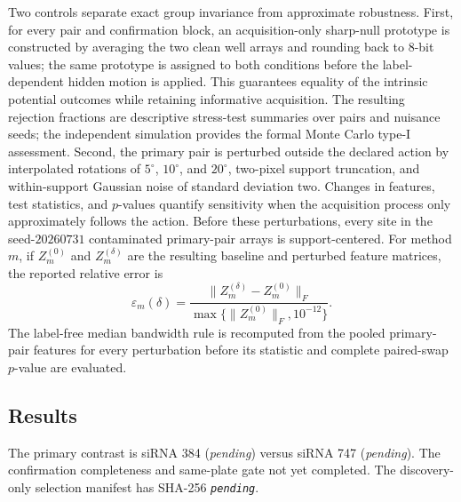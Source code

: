 \documentclass[11pt]{article}
\theoremstyle{definition}
\theoremstyle{remark}
\newcommand{\1}{\mathbf 1}
\newcommand{\pending}{\textnormal{\textit{pending}}}
\newif\ifresultsavailable
\providecommand{\RxTreatmentA}{\pending}
\providecommand{\RxTreatmentB}{\pending}
\providecommand{\RxPlateAudit}{not yet completed}
\providecommand{\RxManifestHash}{\pending}
\begin{document}
Two controls separate exact group invariance from approximate robustness.
First, for every pair and confirmation block, an acquisition-only sharp-null
prototype is constructed by averaging the two clean well arrays and rounding
back to 8-bit values; the same prototype is assigned to both conditions before
the label-dependent hidden motion is applied.  This guarantees equality of the
intrinsic potential outcomes while retaining informative acquisition.  The
resulting rejection fractions are descriptive stress-test summaries over
pairs and nuisance seeds; the independent simulation provides the formal Monte
Carlo type-I assessment.  Second, the primary pair is perturbed outside the
declared action by interpolated rotations of \(5^\circ\), \(10^\circ\), and
\(20^\circ\), two-pixel support truncation, and within-support Gaussian noise of
standard deviation two.  Changes in features, test statistics, and
\(p\)-values quantify sensitivity when the acquisition process only
approximately follows the action.  Before these perturbations, every site in
the seed-\(20260731\) contaminated primary-pair arrays is support-centered.
For method \(m\), if \(Z_m^{(0)}\) and \(Z_m^{(\delta)}\) are the resulting
baseline and perturbed feature matrices, the reported relative error is
\[
 \varepsilon_m(\delta)=
 \frac{\|Z_m^{(\delta)}-Z_m^{(0)}\|_F}
 {\max\{\|Z_m^{(0)}\|_F,10^{-12}\}}.
\]
The label-free median bandwidth rule is recomputed from the pooled primary-pair
features for every perturbation before its statistic and complete paired-swap
\(p\)-value are evaluated.

\subsection{Results}

\ifresultsavailable
The primary contrast is siRNA 384 (\RxTreatmentA) versus siRNA 747
(\RxTreatmentB).  The confirmation completeness and same-plate gate
\RxPlateAudit.  The discovery-only selection manifest has SHA-256
{\scriptsize\texttt{\RxManifestHash}}.
\end{document}
